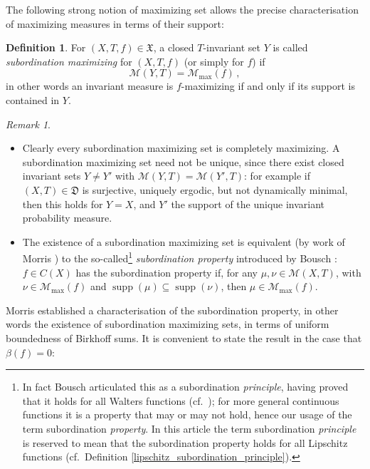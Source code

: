 \documentclass[reqno,11pt]{amsart}
\theoremstyle{definition}
\newtheorem{defn}[thm]{Definition}
\theoremstyle{remark}
\theoremstyle{remark}
\newtheorem{rem}[thm]{Remark}
\def\m{\mathcal M}
\newcommand{\supp}{\operatorname{supp}}
\def\X{\mathfrak{X}}
\def\D{\mathfrak{D}}
\numberwithin{equation}{section}
\begin{document}
The following strong notion of maximizing set allows
the precise characterisation of maximizing measures
in terms of their support:

\begin{defn}\label{subordinationmaximizingdefn}
For $(X,T,f)\in\X$,
a closed $T$-invariant set $Y$ is called
\emph{subordination maximizing} for $(X,T,f)$ (or simply for $f$)
if 
\begin{equation}\label{mcequalsmmax}
\m(Y,T) = \m_{\max}(f)\,,
\end{equation}
in other words an invariant measure 
is $f$-maximizing if and only if its support is contained in $Y$.
\end{defn}

\begin{rem}\label{subordinationremark}
\begin{itemize}
\item[(a)]
Clearly every 
subordination maximizing set is
completely maximizing.
A subordination maximizing set need not be unique, since there exist closed invariant sets
$Y\neq Y'$ with $\m(Y,T)=\m(Y',T)$: for example if $(X,T)\in\D$ is surjective, uniquely ergodic, but not dynamically minimal,
then this holds for $Y=X$, and $Y'$ the support of the unique invariant probability measure.
\item[(b)]
The existence of a subordination maximizing set is equivalent 
(by work of Morris \cite[Thm.~1, Prop.~1]{M07})
to the so-called\footnote{In fact Bousch \cite[p.~290]{B01} articulated this
as a subordination \emph{principle}, having proved that it holds for all Walters functions (cf.~\cite{walters});
for more general continuous functions it is a property that may or may not hold,
hence our usage of the term subordination \emph{property}. In this article the term subordination \emph{principle} is reserved to mean that the subordination property holds for all Lipschitz functions (cf.~Definition \ref{lipschitz_subordination_principle}).}
 \emph{subordination property} 
 introduced by Bousch \cite[p.~290]{B01}:
 $f\in C(X)$ has the subordination property
if, for any $\mu,\nu\in\m(X,T)$, with $\nu\in\m_{\max}(f)$ and $\supp(\mu)\subseteq\supp(\nu)$, then 
$\mu\in\m_{\max}(f)$.
\end{itemize}
\end{rem}


Morris \cite[Thm.~1]{M07} established a characterisation of the subordination property, in other words the existence of subordination maximizing sets, in terms of uniform boundedness of Birkhoff sums.
It is convenient to state the result in the case that $\beta(f)=0$:
\end{document}
